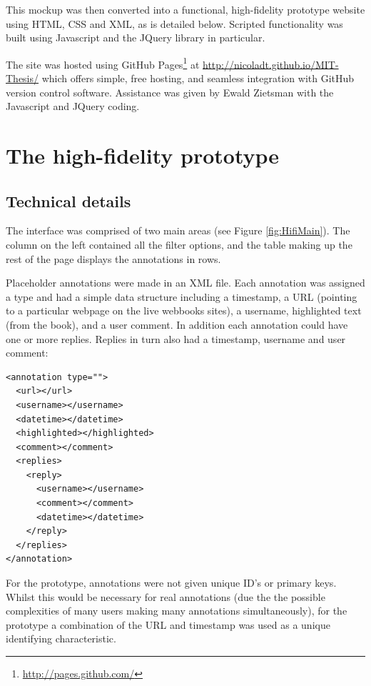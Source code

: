 This mockup was then converted into a functional, high-fidelity prototype website using HTML, CSS and XML, as is detailed below. Scripted functionality was built using Javascript and the JQuery library in particular.  

The site was hosted using GitHub Pages\footnote{\href{http://pages.github.com/}{ http://pages.github.com/}} at \href{http://nicoladt.github.io/MIT-Thesis/}{http://nicoladt.github.io/MIT-Thesis/} which offers simple, free hosting, and seamless integration with GitHub version control software. Assistance was given by Ewald Zietsman with the Javascript and JQuery coding. 

\section{The high-fidelity prototype}



\subsection{Technical details}
The interface was comprised of two main areas (see Figure \ref{fig:HifiMain}). The column on the left contained all the filter options, and the table making up the rest of the page displays the annotations in rows.

Placeholder annotations were made in an XML file. Each annotation was assigned a type and had a simple data structure including a timestamp, a URL (pointing to a particular webpage on the live webbooks sites), a username, highlighted text (from the book), and a user comment. In addition each annotation could have one or more replies. Replies in turn also had a timestamp, username and user comment: 
\begin{verbatim}
<annotation type="">
  <url></url>
  <username></username>
  <datetime></datetime>
  <highlighted></highlighted>
  <comment></comment>
  <replies>
    <reply>
      <username></username>
      <comment></comment>
      <datetime></datetime>
    </reply>
  </replies>
</annotation>
\end{verbatim}

For the prototype, annotations were not given unique ID's or primary keys. Whilst this would be necessary for real annotations (due the the possible complexities of many users making many annotations simultaneously), for the prototype a combination of the URL and timestamp was used as a unique identifying characteristic. 

